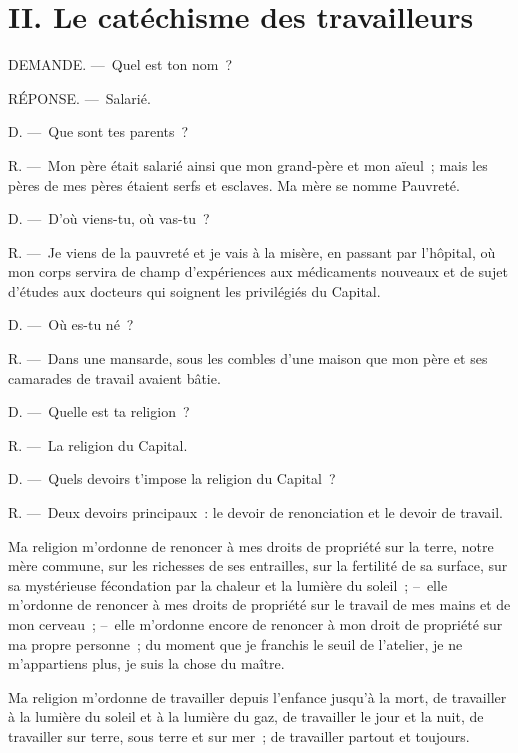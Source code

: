 \documentclass[french,twoside]{book} %
\newcommand\chapteropen{} %
\newcommand\chaptercont{} %
\begin{document}
\chapteropen

\chapter[{II. Le catéchisme des travailleurs}]{II. Le catéchisme des travailleurs}
\renewcommand{\leftmark}{II. Le catéchisme des travailleurs}


\chaptercont
DEMANDE. — Quel est ton nom ?\par
RÉPONSE. — Salarié.\par
D. — Que sont tes parents ?\par
R. — Mon père était salarié ainsi que mon grand-père et mon aïeul ; mais les pères de mes pères étaient serfs et esclaves. Ma mère se nomme Pauvreté.\par
D. — D'où viens-tu, où vas-tu ?\par
R. — Je viens de la pauvreté et je vais à la misère, en passant par l’hôpital, où mon corps servira de champ d’expériences aux médicaments nouveaux et de sujet d’études aux docteurs qui soignent les privilégiés du Capital.\par
D. — Où es-tu né ?\par
R. — Dans une mansarde, sous les combles d’une maison que mon père et ses camarades de travail avaient bâtie.\par
D. — Quelle est ta religion ?\par
R. — La religion du Capital.\par
D. — Quels devoirs t’impose la religion du Capital ?\par
R. — Deux devoirs principaux : le devoir de renonciation et le devoir de travail.\par
Ma religion m’ordonne de renoncer à mes droits de propriété sur la terre, notre mère commune, sur les richesses de ses entrailles, sur la fertilité de sa surface, sur sa mystérieuse fécondation par la chaleur et la lumière du soleil ; – elle m’ordonne de renoncer à mes droits de propriété sur le travail de mes mains et de mon cerveau ; – elle m’ordonne encore de renoncer à mon droit de propriété sur ma propre personne ; du moment que je franchis le seuil de l’atelier, je ne m’appartiens plus, je suis la chose du maître.\par
Ma religion m’ordonne de travailler depuis l’enfance jusqu’à la mort, de travailler à la lumière du soleil et à la lumière du gaz, de travailler le jour et la nuit, de travailler sur terre, sous terre et sur mer ; de travailler partout et toujours.\par
\end{document}
